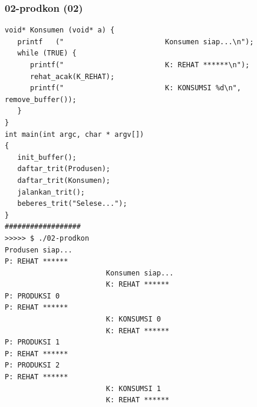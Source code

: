 \documentclass[xcolor=table, notheorems, hyperref={pdfpagelabels=false}]{beamer}
\begin{document}
\begin{frame}[fragile]
\frametitle{02-prodkon (02)}
\begin{lstlisting}[basicstyle=\ttfamily\tiny]
void* Konsumen (void* a) {
   printf   ("                        Konsumen siap...\n");
   while (TRUE) {
      printf("                        K: REHAT ******\n");
      rehat_acak(K_REHAT);
      printf("                        K: KONSUMSI %d\n", remove_buffer());
   }
}
int main(int argc, char * argv[])
{
   init_buffer();
   daftar_trit(Produsen);
   daftar_trit(Konsumen);
   jalankan_trit();
   beberes_trit("Selese...");
}
##################
>>>>> $ ./02-prodkon 
Produsen siap...
P: REHAT ******
                        Konsumen siap...
                        K: REHAT ******
P: PRODUKSI 0
P: REHAT ******
                        K: KONSUMSI 0
                        K: REHAT ******
P: PRODUKSI 1
P: REHAT ******
P: PRODUKSI 2
P: REHAT ******
                        K: KONSUMSI 1
                        K: REHAT ******

\end{lstlisting}
\end{frame}

\end{document}
